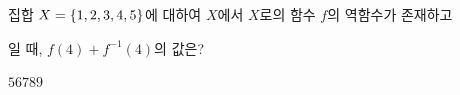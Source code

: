 집합 $X=\{1{,}\mkern3mu\mathopen{}2{,}\mkern3mu\mathopen{}3{,}\mkern3mu\mathopen{}4{,}\mkern3mu\mathopen{}5\}$에 대하여 $X$에서 $X$로의 함수 $f$의 역함수가 존재하고 \par\smallskip{}\par\smallskip\noindent 일 때, $f(4)+f^{-1}(4)$의 값은?
\begin{choices32}{$5$}{$6$}{$7$}{$8$}{$9$}\end{choices32}

